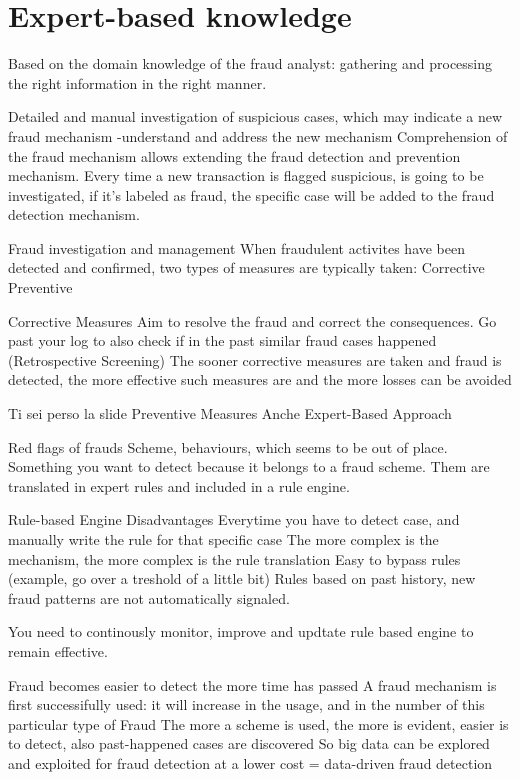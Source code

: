 \section{Expert-based knowledge}
    Based on the domain knowledge of the fraud analyst: gathering and processing the right information in the right manner.
    
    Detailed and manual investigation of suspicious cases, which may indicate a new fraud mechanism
        -understand and address the new mechanism 
    Comprehension of the fraud mechanism allows extending the fraud detection and prevention mechanism. Every time a new transaction is flagged suspicious, is going to be investigated, if it's labeled as fraud, the specific case will be added to the fraud detection mechanism.


Fraud investigation and management
    When fraudulent activites have been detected and confirmed, two types of measures are typically taken:
        Corrective 
        Preventive 

    Corrective Measures 
        Aim to resolve the fraud and correct the consequences. Go past your log to also check if in the past similar fraud cases happened (Retrospective Screening)
        The sooner corrective measures are taken and fraud is detected, the more effective such measures are and the more losses can be avoided

    Ti sei perso la slide Preventive Measures 
Anche Expert-Based Approach

Red flags of frauds
        Scheme, behaviours, which seems to be out of place. Something you want to detect because it belongs to a fraud scheme.
        Them are translated in expert rules and included in a rule engine.
    
Rule-based Engine Disadvantages 
        Everytime you have to detect case, and manually write the rule for that specific case
        The more complex is the mechanism, the more complex is the rule translation 
        Easy to bypass rules (example, go over a treshold of a little bit)
        Rules based on past history, new fraud patterns are not automatically signaled.

        You need to continously monitor, improve and updtate rule based engine to remain effective.

Fraud becomes easier to detect the more time has passed
        A fraud mechanism is first successifully used: it will increase in the usage, and in the number of this particular type of Fraud
        The more a scheme is used, the more is evident, easier is to detect, also past-happened cases are discovered
        So big data can be explored and exploited for fraud detection at a lower cost = data-driven fraud detection

